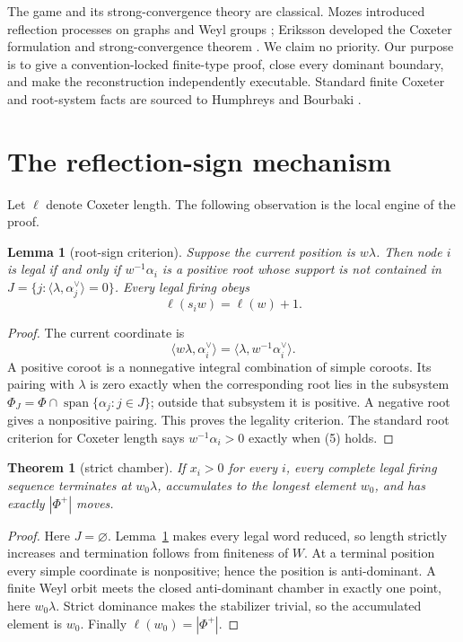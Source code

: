 \documentclass[10pt]{article}
\newtheorem{theorem}{Theorem}
\newtheorem{lemma}{Lemma}
\newcommand{\ellW}{\ell}
\begin{document}
The game and its strong-convergence theory are classical.  Mozes introduced
reflection processes on graphs and Weyl groups \cite{Mozes1990}; Eriksson
developed the Coxeter formulation and strong-convergence theorem
\cite{Eriksson1995,Eriksson1996}.  We claim no priority.  Our purpose is to
give a convention-locked finite-type proof, close every dominant boundary,
and make the reconstruction independently executable.  Standard finite
Coxeter and root-system facts are sourced to Humphreys and Bourbaki
\cite{Humphreys1990,Bourbaki2002}.

\section{The reflection-sign mechanism}

Let $\ellW$ denote Coxeter length.  The following observation is the local
engine of the proof.

\begin{lemma}[root-sign criterion]\label{lem:sign}
Suppose the current position is $w\lambda$.  Then node $i$ is legal if and
only if $w^{-1}\alpha_i$ is a positive root whose support is not contained in
$J=\{j:\langle\lambda,\alpha_j^\vee\rangle=0\}$.  Every legal firing obeys
\[
 \ellW(s_iw)=\ellW(w)+1.                                  \tag{5}
\]
\end{lemma}

\begin{proof}
The current coordinate is
\[
 \langle w\lambda,\alpha_i^\vee\rangle
   =\langle\lambda,w^{-1}\alpha_i^\vee\rangle.           \tag{6}
\]
A positive coroot is a nonnegative integral combination of simple coroots.
Its pairing with $\lambda$ is zero exactly when the corresponding root lies
in the subsystem $\Phi_J=\Phi\cap\operatorname{span}\{\alpha_j:j\in J\}$;
outside that subsystem it is positive.  A negative root gives a nonpositive
pairing.  This proves the legality criterion.  The standard root criterion
for Coxeter length says $w^{-1}\alpha_i>0$ exactly when (5) holds.
\end{proof}

\begin{theorem}[strict chamber]\label{thm:strict}
If $x_i>0$ for every $i$, every complete legal firing sequence terminates at
$w_0\lambda$, accumulates to the longest element $w_0$, and has exactly
$|\Phi^+|$ moves.
\end{theorem}

\begin{proof}
Here $J=\varnothing$.  Lemma~\ref{lem:sign} makes every legal word reduced,
so length strictly increases and termination follows from finiteness of $W$.
At a terminal position every simple coordinate is nonpositive; hence the
position is anti-dominant.  A finite Weyl orbit meets the closed
anti-dominant chamber in exactly one point, here $w_0\lambda$.  Strict
dominance makes the stabilizer trivial, so the accumulated element is $w_0$.
Finally $\ellW(w_0)=|\Phi^+|$.
\end{proof}
\end{document}
